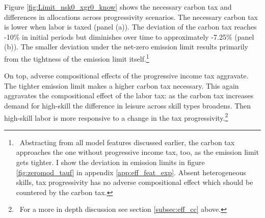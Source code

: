 Figure \ref{fig:Limit_nsk0_xgr0_know} shows the necessary carbon tax and differences in allocations across progressivity scenarios. 
The necessary carbon tax is lower when labor is taxed (panel (a)). The deviation of the carbon tax reaches -10\% in initial periods but diminishes over time to approximately -7.25\% (panel (b)).
The smaller deviation under the net-zero emission limit results primarily from the tightness of the emission limit itself.\footnote{\ Abstracting from all model features discussed earlier, the carbon tax approaches the one without progressive income tax, too, as the emission limit gets tighter. I show the deviation in emission limits in figure \ref{fig:zeromod_tauf} in appendix \ref{app:eff_feat_exp}. Absent heterogeneous skills, tax progressivity has no adverse compositional effect which should be countered by the carbon tax. }

On top, adverse compositional effects of the progressive income tax aggravate. The tighter emission limit makes a higher carbon tax necessary. This again aggravates the compositional effect of the labor tax:  as the carbon tax increases demand for high-skill the difference in leisure across skill types broadens. Then high-skill labor is more responsive to a change in the tax progressivity.\footnote{\ For a more in depth discussion see section \ref{subsec:eff_cc} above.}


